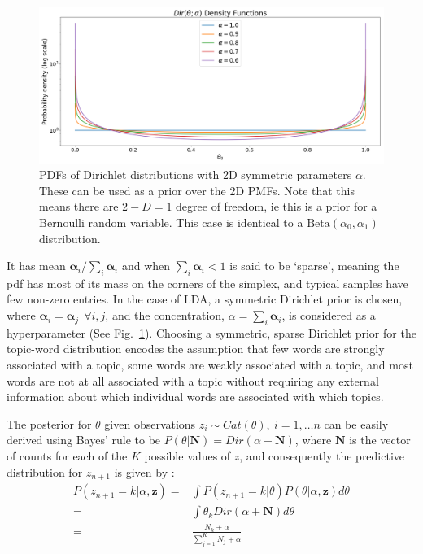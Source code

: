 \begin{figure}
	\centering
	\includegraphics[width=0.65\columnwidth]{figures/beta.png}
	\caption{
		PDFs of Dirichlet distributions with 2D symmetric parameters $\alpha$. These can be used as a prior over the 2D PMFs. Note that this means there are $2-D = 1$ degree of freedom, ie this is a prior for a Bernoulli random variable. This case is identical to a $\mathrm{Beta}(\alpha_0, \alpha_1)$ distribution.
	}
	\label{fig:beta-pdf}

\end{figure}

It has mean $\boldsymbol{\alpha}_i / \sum_i \boldsymbol{\alpha}_i$ and when $\sum_i \boldsymbol{\alpha}_i < 1$ is said to be `sparse', meaning the pdf has most of its mass on the corners of the simplex, and typical samples have few non-zero entries. In the case of LDA, a symmetric Dirichlet prior is chosen, where $\boldsymbol{\alpha}_i = \boldsymbol{\alpha}_j ~~\forall i, j$, and the concentration, $\alpha = \sum_i \boldsymbol{\alpha}_i$, is considered as a hyperparameter (See Fig.~\ref{fig:beta-pdf}). Choosing a symmetric, sparse Dirichlet prior for the topic-word distribution encodes the assumption that few words are strongly associated with a topic, some words are weakly associated with a topic, and most words are not at all associated with a topic without requiring any external information about which individual words are associated with which topics.

The posterior for $\theta$ given observations $z_i \sim Cat(\theta),~i = 1, \ldots n$ can be easily derived using Bayes' rule to be $P(\theta | \boldsymbol{N}) = Dir(\alpha + \boldsymbol{N})$, where $\boldsymbol{N}$ is the vector of counts for each of the $K$ possible values of $z$, and consequently the predictive distribution for $z_{n+1}$ is given by \citep{BishopCh2}:
\begin{equation}
\begin{split}
P(z_{n+1}=k | \alpha, \boldsymbol{z}) =& \int P(z_{n+1}=k | \theta) P(\theta | \alpha, \boldsymbol{z}) d\theta\\
=& \int \theta_k Dir(\alpha + \boldsymbol{N}) d\theta\\
=& \frac{N_k + \alpha}{\sum_{j=1}^K N_j + \alpha}
\end{split}
\end{equation}

